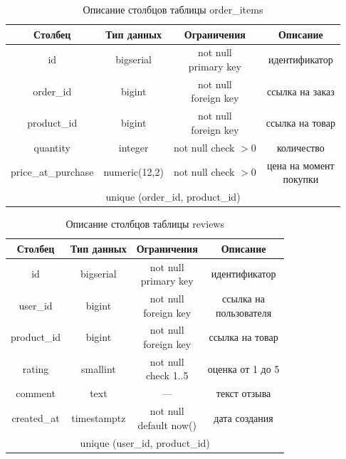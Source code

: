 \begin{table}[H]
    \caption{Описание столбцов таблицы order\_items}
    \label{tbl:t_order_items}
    \rpzcompacttable
    \begin{tabular}[]{|c|c|c|c|}
        \hline
        \textbf{Столбец} & \textbf{Тип данных} & \textbf{Ограничения} & \textbf{Описание} \\ \hline
        id & bigserial & \makecell{not null \\ primary key} & идентификатор \\ \hline
        order\_id & bigint & \makecell{not null \\ foreign key} & ссылка на заказ \\ \hline
        product\_id & bigint & \makecell{not null \\ foreign key} & ссылка на товар \\ \hline
        quantity & integer & \makecell{not null \\ check $> 0$} & количество \\ \hline
        price\_at\_purchase & numeric(12,2) & \makecell{not null \\ check $> 0$} & \makecell{цена на момент\\покупки} \\ \hline
        \multicolumn{4}{|c|}{unique (order\_id, product\_id)} \\ \hline
    \end{tabular}
\end{table}

\begin{table}[H]
    \caption{Описание столбцов таблицы reviews}
    \label{tbl:t_reviews}
    \rpzcompacttable
    \begin{tabular}[]{|c|c|c|c|}
        \hline
        \textbf{Столбец} & \textbf{Тип данных} & \textbf{Ограничения} & \textbf{Описание} \\ \hline
        id & bigserial & \makecell{not null \\ primary key} & идентификатор \\ \hline
        user\_id & bigint & \makecell{not null \\ foreign key} & \makecell{ссылка на\\пользователя} \\ \hline
        product\_id & bigint & \makecell{not null \\ foreign key} & ссылка на товар \\ \hline
        rating & smallint & \makecell{not null \\ check 1..5} & оценка от 1 до 5 \\ \hline
        comment & text & --- & текст отзыва \\ \hline
        created\_at & timestamptz & \makecell{not null \\ default now()} & дата создания \\ \hline
        \multicolumn{4}{|c|}{unique (user\_id, product\_id)} \\ \hline
    \end{tabular}
\end{table}


